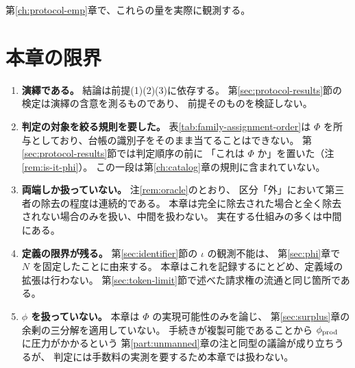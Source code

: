 第\ref{ch:protocol-emp}章で、これらの量を実際に観測する。

\section{本章の限界}
\label{sec:protocol-limits}

\begin{enumerate}[label=(\arabic*)]
\item \textbf{演繹である。} 結論は前提(1)(2)(3)に依存する。
第\ref{sec:protocol-results}節の検定は演繹の含意を測るものであり、
前提そのものを検証しない。

\item \textbf{判定の対象を絞る規則を要した。} 表\ref{tab:family-assignment-order}は
$\Phi$ を所与としており、台帳の識別子をそのまま当てることはできない。
第\ref{sec:protocol-results}節では判定順序の前に
「これは $\Phi$ か」を置いた（注\ref{rem:is-it-phi}）。
この一段は第\ref{ch:catalog}章の規則に含まれていない。

\item \textbf{両端しか扱っていない。} 注\ref{rem:oracle}のとおり、
区分「外」において第三者の除去の程度は連続的である。
本章は完全に除去された場合と全く除去されない場合のみを扱い、中間を扱わない。
実在する仕組みの多くは中間にある。

\item \textbf{定義の限界が残る。} 第\ref{sec:identifier}節の $\iota$ の観測不能は、
第\ref{sec:phi}章で $N$ を固定したことに由来する。
本章はこれを記録するにとどめ、定義域の拡張は行わない。
第\ref{sec:token-limit}節で述べた請求権の流通と同じ箇所である。

\item \textbf{$\phi$ を扱っていない。} 本章は $\Phi$ の実現可能性のみを論じ、
第\ref{sec:surplus}章の余剰の三分解を適用していない。
手続きが複製可能であることから $\phi_{\rm prod}$ に圧力がかかるという
第\ref{part:unmanned}章の注と同型の議論が成り立ちうるが、
判定には手数料の実測を要するため本章では扱わない。
\end{enumerate}

